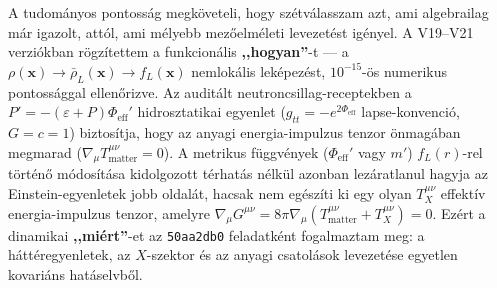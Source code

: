 \documentclass[10pt,a4paper]{article}
\begin{document}
\par
A tudom\'anyos pontoss\'ag megk\"oveteli, hogy sz\'etv\'alasszam azt, ami algebrailag m\'ar igazolt, att\'ol, ami m\'elyebb mez\H{o}elm\'eleti levezet\'est ig\'enyel. A V19--V21 verzi\'okban r\"ogz\'itettem a funkcion\'alis \textbf{,,hogyan''}-t --- a $\rho(\mathbf{x}) \to \bar{\rho}_L(\mathbf{x}) \to f_L(\mathbf{x})$ nemlok\'alis lek\'epez\'est, $10^{-15}$-\"os numerikus pontoss\'aggal ellen\H{o}rizve. Az audit\'alt neutroncsillag-receptekben a $P' = -(\varepsilon+P)\Phi_{\text{eff}}'$ hidrosztatikai egyenlet ($g_{tt} = -e^{2\Phi_{\text{eff}}}$ lapse-konvenció, $G=c=1$) biztos\'itja, hogy az anyagi energia-impulzus tenzor \"onmag\'aban megmarad ($\nabla_\mu T^{\mu\nu}_{\text{matter}} = 0$). A metrikus f\"uggv\'enyek ($\Phi_{\text{eff}}'$ vagy $m'$) $f_L(r)$-rel t\"ort\'en\H{o} m\'odos\'it\'asa kidolgozott t\'erhat\'as n\'elk\"ul azonban lez\'aratlanul hagyja az Einstein-egyenletek jobb oldal\'at, hacsak nem eg\'esz\'iti ki egy olyan $T^{\mu\nu}_X$ effekt\'iv energia-impulzus tenzor, amelyre $\nabla_\mu G^{\mu\nu} = 8\pi\nabla_\mu(T^{\mu\nu}_{\text{matter}} + T^{\mu\nu}_X) = 0$. Ez\'ert a dinamikai \textbf{,,mi\'ert''}-et az \texttt{50aa2db0} feladatk\'ent fogalmaztam meg: a h\'att\'eregyenletek, az $X$-szektor \'es az anyagi csatol\'asok levezet\'ese egyetlen kovari\'ans hat\'aselvb\H{o}l.
\end{document}
